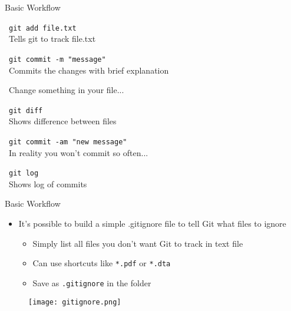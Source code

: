 \documentclass[12pt]{beamer}
\begin{document}
\begin{frame}{Basic Workflow}

\textbullet\ \texttt{git add file.txt} \\
\qquad \textbullet\ {\footnotesize Tells git to track file.txt} \\
\vspace{.4cm}

\textbullet\ \texttt{git commit -m "message"} \\
\qquad \textbullet\ {\footnotesize Commits the changes with brief explanation} \\
\vspace{.4cm}

\textbullet\ Change something in your file... \\
\vspace{.4cm}

\textbullet\ \texttt{git diff} \\
\qquad \textbullet\ {\footnotesize Shows difference between files} \\
\vspace{.4cm}

\textbullet\ \texttt{git commit -am "new message"} \\
\qquad \textbullet\ {\footnotesize In reality you won't commit so often...} \\
\vspace{.4cm}

\textbullet\ \texttt{git log} \\
\qquad \textbullet\ {\footnotesize Shows log of commits} \\
\vspace{.4cm}

\end{frame}


\begin{frame}{Basic Workflow}

\begin{itemize}
	\item It's possible to build a simple .gitignore file to tell Git what files to ignore
\vspace{.4cm}

\begin{itemize}
	\item Simply list all files you don't want Git to track in text file
	\vspace{.2cm}
	\item Can use shortcuts like \texttt{*.pdf} or \texttt{*.dta}
	\vspace{.2cm}
	\item Save as \texttt{.gitignore} in the folder
\end{itemize}
\end{itemize}
	\begin{figure}
	\texttt{[image: gitignore.png]}
\end{figure}
\end{frame}
\end{document}
